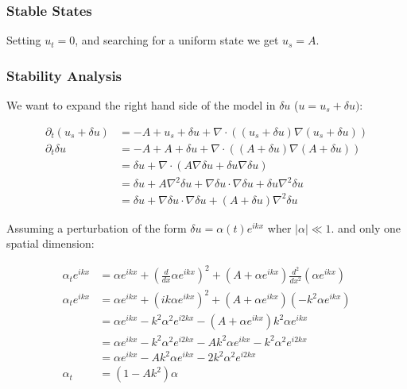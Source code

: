 \subsubsection{Stable States}

Setting $u_{t}=0$, and searching for a uniform state we get $u_{s}=A$.

\subsubsection{Stability Analysis}

We want to expand the right hand side of the model in $\delta u$
($u=u_{s}+\delta u)$:

\begin{align*}
\partial_{t}\left(u_{s}+\delta u\right) & =-A+u_{s}+\delta u+\nabla\cdot\left(\left(u_{s}+\delta u\right)\nabla\left(u_{s}+\delta u\right)\right)\\
\partial_{t}\delta u & =-A+A+\delta u+\nabla\cdot\left(\left(A+\delta u\right)\nabla\left(A+\delta u\right)\right)\\
 & =\delta u+\nabla\cdot\left(A\nabla\delta u+\delta u\nabla\delta u\right)\\
 & =\delta u+A\nabla^{2}\delta u+\nabla\delta u\cdot\nabla\delta u+\delta u\nabla^{2}\delta u\\
 & =\delta u+\nabla\delta u\cdot\nabla\delta u+\left(A+\delta u\right)\nabla^{2}\delta u
\end{align*}

Assuming a perturbation of the form $\delta u=\alpha\left(t\right)e^{ikx}$
wher $\left|\alpha\right|\ll1$. and only one spatial dimension:

\begin{align*}
\alpha_{t}e^{ikx} & =\alpha e^{ikx}+\left(\frac{d}{dx}\alpha e^{ikx}\right)^{2}+\left(A+\alpha e^{ikx}\right)\frac{d^{2}}{dx^{2}}\left(\alpha e^{ikx}\right)\\
\alpha_{t}e^{ikx} & =\alpha e^{ikx}+\left(ik\alpha e^{ikx}\right)^{2}+\left(A+\alpha e^{ikx}\right)\left(-k^{2}\alpha e^{ikx}\right)\\
 & =\alpha e^{ikx}-k^{2}\alpha^{2}e^{i2kx}-\left(A+\alpha e^{ikx}\right)k^{2}\alpha e^{ikx}\\
 & =\alpha e^{ikx}-k^{2}\alpha^{2}e^{i2kx}-Ak^{2}\alpha e^{ikx}-k^{2}\alpha^{2}e^{i2kx}\\
 & =\alpha e^{ikx}-Ak^{2}\alpha e^{ikx}-2k^{2}\alpha^{2}e^{i2kx}\\
\alpha_{t} & =\left(1-Ak^{2}\right)\alpha
\end{align*}
